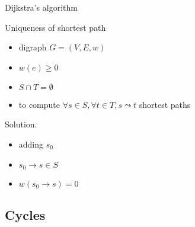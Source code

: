 \begin{frame}{Dijkstra's algorithm}
  \begin{exampleblock}{Uniqueness of shortest path }
    \begin{itemize}
      \item digraph $G = (V, E, w)$
      \item $w(e) \ge 0$
      \item $S \cap T = \emptyset$
      \item to compute $\forall s \in S, \forall t \in T, s \leadsto t$ shortest paths
    \end{itemize}
  \end{exampleblock}

  \begin{block}{Solution.}
    \begin{itemize}
      \item adding $s_{0}$
      \item $s_{0} \to s \in S$
      \item $w(s_{0} \to s) = 0$
    \end{itemize}
  \end{block}
\end{frame}
\subsection{Cycles}

